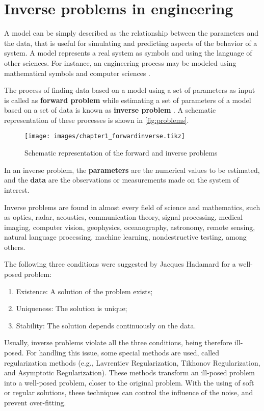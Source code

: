 \section{Inverse problems in engineering}

A model can be simply described as the relationship between the parameters and the data, that is useful for simulating and predicting aspects of the behavior of a system. A model represents a real system as symbols and using the language of other sciences. For instance, an engineering process may be modeled using mathematical symbols and computer sciences \cite{alavala2008finite}.

The process of finding data based on a model using a set of parameters as input is called as \textbf{forward problem} while estimating a set of parameters of a model based on a set of data is known as \textbf{inverse problem} \cite{CamposVelho2001problemas,silvaneto2005problemas,camposvelho2008}. A schematic representation of these processes is shown in \autoref{fig:problems}.

\begin{figure}[H]
    \caption{Schematic representation of the forward and inverse problems}
    \label{fig:problems}
    \centering
    \texttt{[image: images/chapter1\_forwardinverse.tikz]}
\end{figure}

In an inverse problem, the \textbf{parameters} are the numerical values to be estimated, and the \textbf{data} are the observations or measurements made on the system of interest.

Inverse problems are found in almost every field of science and mathematics, such as optics, radar, acoustics, communication theory, signal processing, medical imaging, computer vision, geophysics, oceanography, astronomy, remote sensing, natural language processing, machine learning, nondestructive testing, among others.

The following three conditions were suggested by Jacques Hadamard for a well-posed problem:

\begin{enumerate}
    \item Existence: A solution of the problem exists;
    \item Uniqueness: The solution is unique;
    \item Stability: The solution depends continuously on the data.
\end{enumerate}

Usually, inverse problems violate all the three conditions, being therefore ill-posed. For handling this issue, some special methods are used, called regularization methods (e.g., Lavrentiev Regularization, Tikhonov Regularization, and Asymptotic Regularization). These methods transform an ill-posed problem into a well-posed problem, closer to the original problem. With the using of soft or regular solutions, these techniques can control the influence of the noise, and prevent over-fitting.

